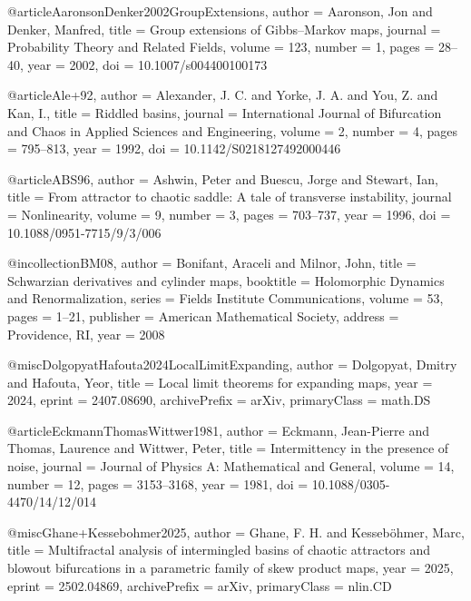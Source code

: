 
@article{AaronsonDenker2002GroupExtensions,
  author  = {Aaronson, Jon and Denker, Manfred},
  title   = {Group extensions of {Gibbs}--{Markov} maps},
  journal = {Probability Theory and Related Fields},
  volume  = {123},
  number  = {1},
  pages   = {28--40},
  year    = {2002},
  doi     = {10.1007/s004400100173}
}

@article{Ale+92,
  author  = {Alexander, J. C. and Yorke, J. A. and You, Z. and Kan, I.},
  title   = {Riddled basins},
  journal = {International Journal of Bifurcation and Chaos in Applied Sciences and Engineering},
  volume  = {2},
  number  = {4},
  pages   = {795--813},
  year    = {1992},
  doi     = {10.1142/S0218127492000446}
}

@article{ABS96,
  author  = {Ashwin, Peter and Buescu, Jorge and Stewart, Ian},
  title   = {From attractor to chaotic saddle: A tale of transverse instability},
  journal = {Nonlinearity},
  volume  = {9},
  number  = {3},
  pages   = {703--737},
  year    = {1996},
  doi     = {10.1088/0951-7715/9/3/006}
}

@incollection{BM08,
  author    = {Bonifant, Araceli and Milnor, John},
  title     = {Schwarzian derivatives and cylinder maps},
  booktitle = {Holomorphic Dynamics and Renormalization},
  series    = {Fields Institute Communications},
  volume    = {53},
  pages     = {1--21},
  publisher = {American Mathematical Society},
  address   = {Providence, RI},
  year      = {2008}
}

@misc{DolgopyatHafouta2024LocalLimitExpanding,
  author        = {Dolgopyat, Dmitry and Hafouta, Yeor},
  title         = {Local limit theorems for expanding maps},
  year          = {2024},
  eprint        = {2407.08690},
  archivePrefix = {arXiv},
  primaryClass  = {math.DS}
}

@article{EckmannThomasWittwer1981,
  author  = {Eckmann, Jean-Pierre and Thomas, Laurence and Wittwer, Peter},
  title   = {Intermittency in the presence of noise},
  journal = {Journal of Physics A: Mathematical and General},
  volume  = {14},
  number  = {12},
  pages   = {3153--3168},
  year    = {1981},
  doi     = {10.1088/0305-4470/14/12/014}
}

@misc{Ghane+Kessebohmer2025,
  author        = {Ghane, F. H. and Kesseb{\"o}hmer, Marc},
  title         = {Multifractal analysis of intermingled basins of chaotic attractors and blowout bifurcations in a parametric family of skew product maps},
  year          = {2025},
  eprint        = {2502.04869},
  archivePrefix = {arXiv},
  primaryClass  = {nlin.CD}
}

